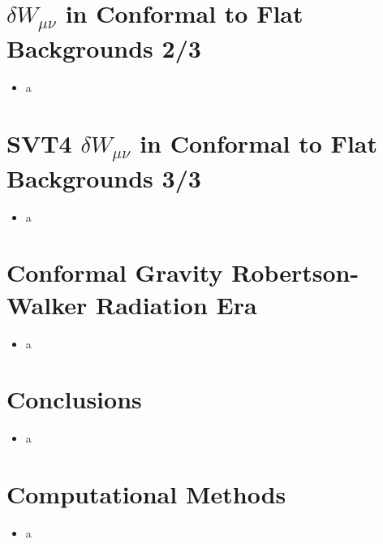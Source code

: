 \documentclass[10pt,letterpaper]{article}
\numberwithin{equation}{section}
\begin{document}
\section{$\delta W_{\mu\nu}$ in Conformal to Flat Backgrounds 2/3}
\begin{itemize}
	\item a
\end{itemize}


\section{SVT4 $\delta W_{\mu\nu}$ in Conformal to Flat Backgrounds 3/3}
\begin{itemize}
	\item a
\end{itemize}


\section{Conformal Gravity Robertson-Walker Radiation Era}
\begin{itemize}
	\item a
\end{itemize}


\section{Conclusions}
\begin{itemize}
	\item a
\end{itemize}


\section{Computational Methods}
\begin{itemize}
	\item a
\end{itemize}
\end{document}
